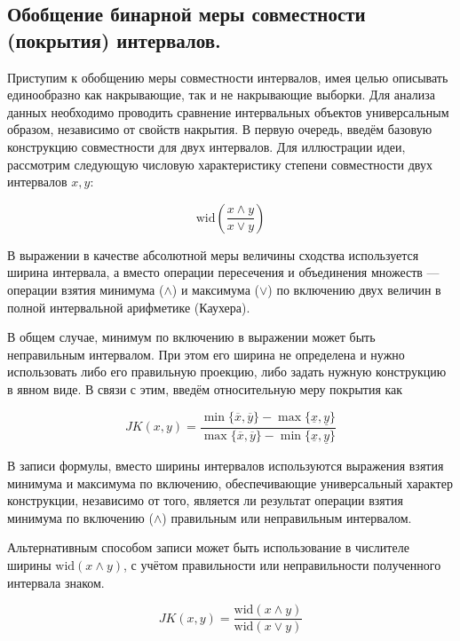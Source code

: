 \documentclass[a4paper,12pt]{article}
\begin{document}
    \subsection{Обобщение бинарной меры совместности (покрытия) интервалов.}
    Приступим к обобщению меры совместности интервалов, имея
    целью описывать единообразно как накрывающие, так и не накрывающие
    выборки.
    Для анализа данных необходимо проводить сравнение интервальных объектов универсальным образом, независимо от свойств накрытия.
    В первую очередь, введём базовую конструкцию совместности для двух интервалов. Для иллюстрации идеи, рассмотрим следующую числовую характеристику степени совместности двух интервалов \(x, y\):

    \begin{equation}
    \text{wid} \left( \frac{x \land y}{x \lor y} \right)
    \end{equation}

    В выражении в качестве абсолютной меры величины сходства используется ширина интервала, а вместо операции пересечения и объединения множеств — операции взятия минимума (\(\land\)) и максимума (\(\lor\)) по включению двух величин в полной интервальной арифметике (Каухера).

    В общем случае, минимум по включению в выражении может быть неправильным интервалом.
    При этом его ширина не определена и нужно использовать либо его правильную проекцию, либо задать нужную конструкцию в явном виде. В связи с этим, введём относительную меру покрытия как

    \begin{equation}
    JK(x, y) = \frac{\min\{\overline{x}, \overline{y}\} - \max\{\underline{x}, \underline{y}\}}{\max\{\overline{x}, \overline{y}\} - \min\{\underline{x}, \underline{y}\}}
    \end{equation}

    В записи формулы, вместо ширины интервалов используются выражения взятия минимума и максимума по включению, обеспечивающие универсальный характер конструкции, независимо от того, является ли результат операции взятия минимума по включению (\(\land\)) правильным или неправильным интервалом.

    Альтернативным способом записи может быть использование в числителе ширины \(\text{wid} (x \land y)\), с учётом правильности или неправильности полученного интервала знаком.

    \begin{equation}
    JK(x, y) = \frac{\text{wid} (x \land y)}{\text{wid} (x \lor y)}
    \end{equation}
\end{document}
